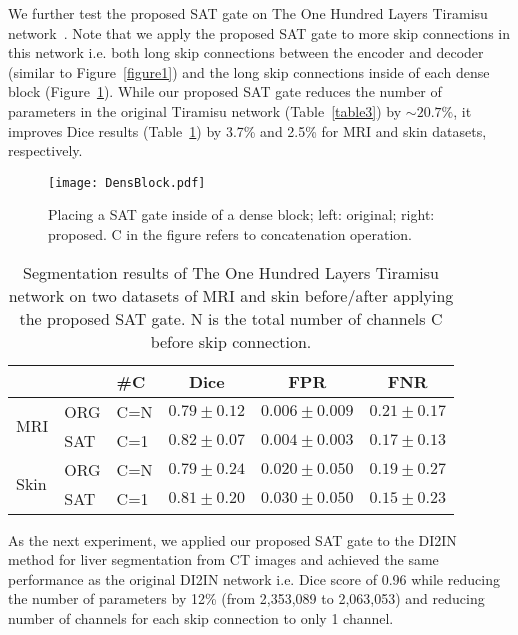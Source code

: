 \documentclass{article}
\begin{document}
We further test the proposed SAT gate on The One Hundred Layers Tiramisu network~\cite{jegou2017one}. Note that we apply the proposed SAT gate to more skip connections in this network i.e. both long skip connections between the encoder and decoder (similar to Figure~\ref{figure1}) and the long skip connections inside of each dense block (Figure~\ref{densblock}). While our proposed SAT gate reduces the number of parameters in the original Tiramisu network (Table~\ref{table3}) by $\sim20.7\%$, it improves Dice results (Table~\ref{tiramisu}) by 3.7\% and 2.5\% for MRI and skin datasets, respectively.  


\begin{figure}[h]
\centering
\texttt{[image: DensBlock.pdf]}
\caption{Placing a SAT gate inside of a dense block; left: original; right: proposed. C in the figure refers to concatenation operation.}
\label{densblock}
\end{figure}


\begin{table}[h]
\small
\setlength{\tabcolsep}{6pt}
\centering
\caption{Segmentation results of The One Hundred Layers Tiramisu network on two datasets of MRI and skin before/after applying the proposed SAT gate. N is the total number of channels C before skip connection.}
\label{tiramisu}
\begin{tabular}{lllccc}
\hline
                      &     & \#C & Dice          & FPR             & FNR           \\ \hline
\multirow{2}{*}{MRI}  & ORG & C=N & $0.79\pm0.12$ & $0.006\pm0.009$ & $0.21\pm0.17$ \\
                      & SAT & C=1 & $0.82\pm0.07$ & $0.004\pm0.003$ & $0.17\pm0.13$ \\ \hline
\multirow{2}{*}{Skin} & ORG & C=N & $0.79\pm0.24$ & $0.020\pm0.050$ & $0.19\pm0.27$ \\
                      & SAT & C=1 & $0.81\pm0.20$ & $0.030\pm0.050$  & $0.15\pm0.23$ \\ \hline
\end{tabular}
\end{table}

As the next experiment, we applied our proposed SAT gate to the DI2IN~\cite{yang2017automatic} method for liver segmentation from CT images and achieved the same performance as the original DI2IN network i.e.  Dice score of 0.96 while reducing the number of parameters by 12\% (from 2,353,089 to 2,063,053) and reducing number of channels for each skip connection to only 1 channel. 
\end{document}
